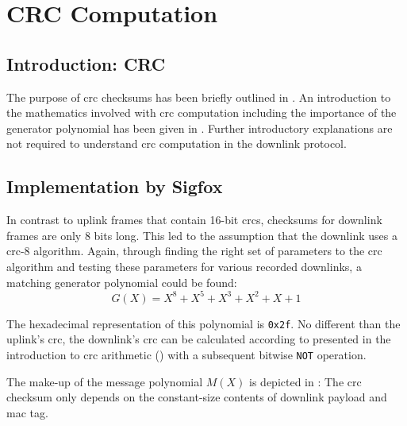\section{CRC Computation}
\subsection{Introduction: CRC}
The purpose of \gls{crc} checksums has been briefly outlined in .
An introduction to the mathematics involved with \gls{crc} computation including the importance of the generator polynomial has been given in .
Further introductory explanations are not required to understand \gls{crc} computation in the downlink protocol.

\subsection{Implementation by Sigfox}
In contrast to uplink frames that contain 16-bit \glspl{crc}, checksums for downlink frames are only 8 bits long.
This led to the assumption that the downlink uses a \gls{crc}-8 algorithm.
Again, through finding the right set of parameters to the \gls{crc} algorithm and testing these parameters for various recorded downlinks, a matching generator polynomial could be found:
\begin{equation}
	G(X) = X^8 + X^5 + X^3 + X^2 + X + 1
\end{equation}

The hexadecimal representation of this polynomial is \texttt{0x2f}.
No different than the uplink's \gls{crc}, the downlink's \gls{crc} can be calculated according to  presented in the introduction to \gls{crc} arithmetic () with a subsequent bitwise \texttt{NOT} operation.

The make-up of the message polynomial $M(X)$ is depicted in :
The \gls{crc} checksum only depends on the constant-size contents of downlink payload and \gls{mac} tag.

